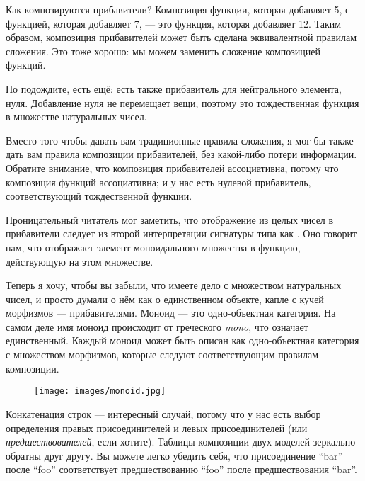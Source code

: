 Как композируются прибавители? Композиция функции, которая добавляет 5, с
функцией, которая добавляет 7, --- это функция, которая добавляет 12. Таким образом, композиция
прибавителей может быть сделана эквивалентной правилам сложения. Это тоже хорошо:
мы можем заменить сложение композицией функций.

Но подождите, есть ещё: есть также прибавитель для нейтрального элемента,
нуля. Добавление нуля не перемещает вещи, поэтому это тождественная
функция в множестве натуральных чисел.

Вместо того чтобы давать вам традиционные правила сложения, я мог бы также
дать вам правила композиции прибавителей, без какой-либо потери информации.
Обратите внимание, что композиция прибавителей ассоциативна, потому что
композиция функций ассоциативна; и у нас есть нулевой прибавитель,
соответствующий тождественной функции.

Проницательный читатель мог заметить, что отображение из целых чисел в
прибавители следует из второй интерпретации сигнатуры типа
 как . Оно
говорит нам, что  отображает элемент моноидального множества в
функцию, действующую на этом множестве.

Теперь я хочу, чтобы вы забыли, что имеете дело с множеством натуральных
чисел, и просто думали о нём как о единственном объекте, капле с кучей
морфизмов --- прибавителями. Моноид --- это одно-объектная категория. На самом деле
имя моноид происходит от греческого \emph{mono}, что означает единственный. Каждый
моноид может быть описан как одно-объектная категория с множеством
морфизмов, которые следуют соответствующим правилам композиции.

\begin{figure}[H]
  \centering
  \texttt{[image: images/monoid.jpg]}
\end{figure}

\noindent
Конкатенация строк --- интересный случай, потому что у нас есть выбор
определения правых присоединителей и левых присоединителей (или \emph{предшествователей}, если
хотите). Таблицы композиции двух моделей зеркально обратны
друг другу. Вы можете легко убедить себя, что присоединение ``bar''
после ``foo'' соответствует предшествованию ``foo'' после предшествования
``bar''.

